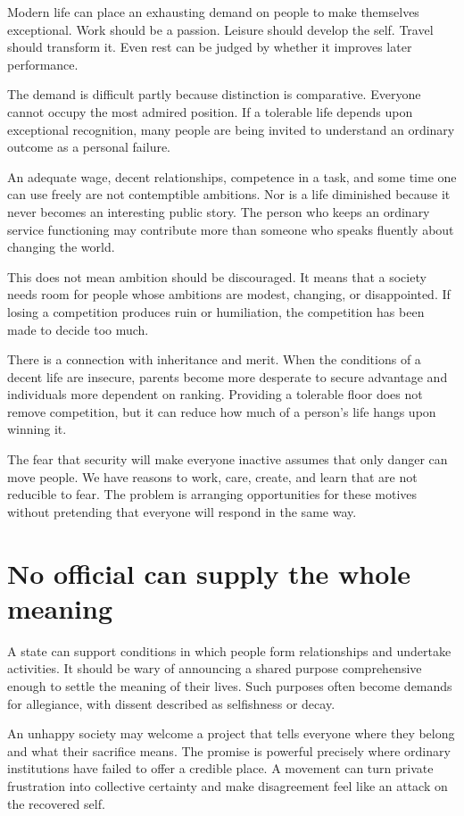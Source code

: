 \documentclass[12pt,a4paper]{book}
\begin{document}
Modern life can place an exhausting demand on people to make themselves exceptional. Work should be a passion. Leisure should develop the self. Travel should transform it. Even rest can be judged by whether it improves later performance.

The demand is difficult partly because distinction is comparative. Everyone cannot occupy the most admired position. If a tolerable life depends upon exceptional recognition, many people are being invited to understand an ordinary outcome as a personal failure.

An adequate wage, decent relationships, competence in a task, and some time one can use freely are not contemptible ambitions. Nor is a life diminished because it never becomes an interesting public story. The person who keeps an ordinary service functioning may contribute more than someone who speaks fluently about changing the world.

This does not mean ambition should be discouraged. It means that a society needs room for people whose ambitions are modest, changing, or disappointed. If losing a competition produces ruin or humiliation, the competition has been made to decide too much.

There is a connection with inheritance and merit. When the conditions of a decent life are insecure, parents become more desperate to secure advantage and individuals more dependent on ranking. Providing a tolerable floor does not remove competition, but it can reduce how much of a person's life hangs upon winning it.

The fear that security will make everyone inactive assumes that only danger can move people. We have reasons to work, care, create, and learn that are not reducible to fear. The problem is arranging opportunities for these motives without pretending that everyone will respond in the same way.

\section*{No official can supply the whole meaning}

A state can support conditions in which people form relationships and undertake activities. It should be wary of announcing a shared purpose comprehensive enough to settle the meaning of their lives. Such purposes often become demands for allegiance, with dissent described as selfishness or decay.

An unhappy society may welcome a project that tells everyone where they belong and what their sacrifice means. The promise is powerful precisely where ordinary institutions have failed to offer a credible place. A movement can turn private frustration into collective certainty and make disagreement feel like an attack on the recovered self.
\end{document}
